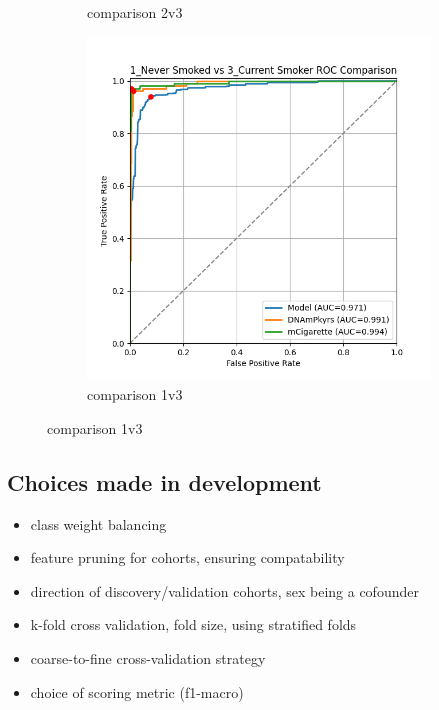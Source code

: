 \documentclass{article}
\begin{document}
\begin{figure}
\begin{subfigure}{0.48\textwidth}
        \caption{comparison 2v3}
    \end{subfigure}
    \par\vspace{0.5em}
    \begin{subfigure}{0.48\textwidth}
        \centering
        \includegraphics[width=\linewidth]{comparison_1v3_roc.png}
        \caption{comparison 1v3}
    \end{subfigure}
\end{figure}

\subsection*{Choices made in development}
\begin{itemize}
    \item class weight balancing
    \item feature pruning for cohorts, ensuring compatability
    \item direction of discovery/validation cohorts, sex being a cofounder
    \item k-fold cross validation, fold size, using stratified folds
    \item coarse-to-fine cross-validation strategy
    \item choice of scoring metric (f1-macro)
\end{itemize}
\end{document}
